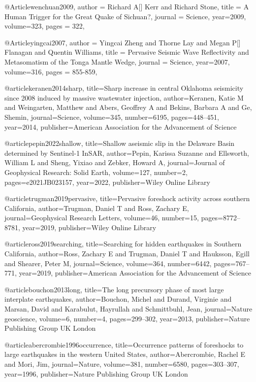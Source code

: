 @Article{wenchuan2009,
  author =	 {Richard A[] Kerr and Richard Stone},
  title =	 {A Human Trigger for the Great Quake of Sichuan?},
  journal =	 {Science},
  year=2009,
  volume=323,
  pages =	 {322},
}

@Article{yingcai2007,
  author =	 {Yingcai Zheng and Thorne Lay and Megan P[] Flanagan and Quentin Williams},
  title =	 {Pervasive Seismic Wave Reflectivity and Metasomatism of the Tonga Mantle Wedge},
  journal =	 {Science},
  year=2007,
  volume=316,
  pages =	 {855-859},
}

@article{keranen2014sharp,
  title={Sharp increase in central Oklahoma seismicity since 2008 induced by massive wastewater injection},
  author={Keranen, Katie M and Weingarten, Matthew and Abers, Geoffrey A and Bekins, Barbara A and Ge, Shemin},
  journal={Science},
  volume={345},
  number={6195},
  pages={448--451},
  year={2014},
  publisher={American Association for the Advancement of Science}
}

@article{pepin2022shallow,
  title={Shallow aseismic slip in the Delaware Basin determined by Sentinel-1 InSAR},
  author={Pepin, Karissa Suzanne and Ellsworth, William L and Sheng, Yixiao and Zebker, Howard A},
  journal={Journal of Geophysical Research: Solid Earth},
  volume={127},
  number={2},
  pages={e2021JB023157},
  year={2022},
  publisher={Wiley Online Library}
}

@article{trugman2019pervasive,
  title={Pervasive foreshock activity across southern California},
  author={Trugman, Daniel T and Ross, Zachary E},
  journal={Geophysical Research Letters},
  volume={46},
  number={15},
  pages={8772--8781},
  year={2019},
  publisher={Wiley Online Library}
}

@article{ross2019searching,
  title={Searching for hidden earthquakes in Southern California},
  author={Ross, Zachary E and Trugman, Daniel T and Hauksson, Egill and Shearer, Peter M},
  journal={Science},
  volume={364},
  number={6442},
  pages={767--771},
  year={2019},
  publisher={American Association for the Advancement of Science}
}

@article{bouchon2013long,
  title={The long precursory phase of most large interplate earthquakes},
  author={Bouchon, Michel and Durand, Virginie and Marsan, David and Karabulut, Hayrullah and Schmittbuhl, Jean},
  journal={Nature geoscience},
  volume={6},
  number={4},
  pages={299--302},
  year={2013},
  publisher={Nature Publishing Group UK London}
}

@article{abercrombie1996occurrence,
  title={Occurrence patterns of foreshocks to large earthquakes in the western United States},
  author={Abercrombie, Rachel E and Mori, Jim},
  journal={Nature},
  volume={381},
  number={6580},
  pages={303--307},
  year={1996},
  publisher={Nature Publishing Group UK London}
}


